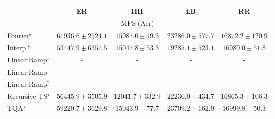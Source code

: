 \begin{tabular}{l|cccc|}
\toprule
            & ER & HH & LB & RR \\
\midrule
\multicolumn{5}{c}{\rule{0pt}{8pt}MPS (Aer)} \\
\midrule
Fourier$^\star$ & {\cellcolor[HTML]{6A0867}} \color[HTML]{F1F1F1} $61936.6\pm 2524.1$ & {\cellcolor[HTML]{E1ECF4}} \color[HTML]{000000} $15087.0\pm 19.3$ & {\cellcolor[HTML]{BCD1E5}} \color[HTML]{000000} $23286.0\pm 577.7$ & {\cellcolor[HTML]{DAE7F1}} \color[HTML]{000000} $16872.2\pm 120.9$ \\
Interp.$^\star$ & {\cellcolor[HTML]{863394}} \color[HTML]{F1F1F1} $53447.9\pm 6357.5$ & {\cellcolor[HTML]{E1EDF5}} \color[HTML]{000000} $15047.8\pm 53.3$ & {\cellcolor[HTML]{CEDFEC}} \color[HTML]{000000} $19285.1\pm 523.1$ & {\cellcolor[HTML]{D9E6F1}} \color[HTML]{000000} $16980.0\pm 51.8$ \\
Linear Ramp$^\star$ & {\cellcolor[HTML]{000000}} \color[HTML]{F1F1F1} {\cellcolor{white}} \color{black} - & {\cellcolor[HTML]{000000}} \color[HTML]{F1F1F1} {\cellcolor{white}} \color{black} - & {\cellcolor[HTML]{000000}} \color[HTML]{F1F1F1} {\cellcolor{white}} \color{black} - & {\cellcolor[HTML]{000000}} \color[HTML]{F1F1F1} {\cellcolor{white}} \color{black} - \\
Linear Ramp & {\cellcolor[HTML]{000000}} \color[HTML]{F1F1F1} {\cellcolor{white}} \color{black} - & {\cellcolor[HTML]{000000}} \color[HTML]{F1F1F1} {\cellcolor{white}} \color{black} - & {\cellcolor[HTML]{000000}} \color[HTML]{F1F1F1} {\cellcolor{white}} \color{black} - & {\cellcolor[HTML]{000000}} \color[HTML]{F1F1F1} {\cellcolor{white}} \color{black} - \\
Linear Ramp$^\dagger$ & {\cellcolor[HTML]{000000}} \color[HTML]{F1F1F1} {\cellcolor{white}} \color{black} - & {\cellcolor[HTML]{000000}} \color[HTML]{F1F1F1} {\cellcolor{white}} \color{black} - & {\cellcolor[HTML]{000000}} \color[HTML]{F1F1F1} {\cellcolor{white}} \color{black} - & {\cellcolor[HTML]{000000}} \color[HTML]{F1F1F1} {\cellcolor{white}} \color{black} - \\
Recursive TS$^\star$ & {\cellcolor[HTML]{831F86}} \color[HTML]{F1F1F1} $56445.9\pm 3505.9$ & {\cellcolor[HTML]{EBF3F8}} \color[HTML]{000000} $12041.7\pm 332.9$ & {\cellcolor[HTML]{C1D4E7}} \color[HTML]{000000} $22230.0\pm 434.7$ & {\cellcolor[HTML]{DAE7F1}} \color[HTML]{000000} $16865.3\pm 106.3$ \\
TQA$^\star$ & {\cellcolor[HTML]{7E0E79}} \color[HTML]{F1F1F1} $59220.7\pm 3629.8$ & {\cellcolor[HTML]{E1EDF5}} \color[HTML]{000000} $15043.9\pm 77.7$ & {\cellcolor[HTML]{BACFE4}} \color[HTML]{000000} $23709.2\pm 162.9$ & {\cellcolor[HTML]{D9E6F1}} \color[HTML]{000000} $16999.8\pm 50.3$ \\

\end{tabular}
